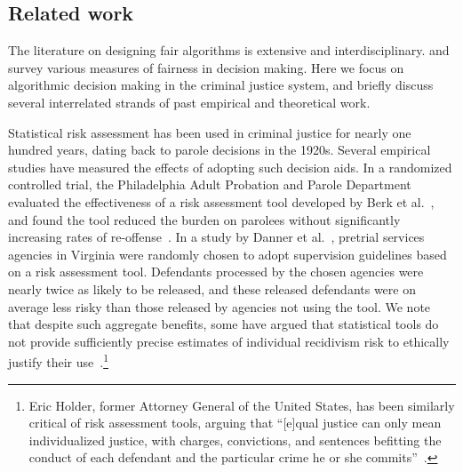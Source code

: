 \documentclass[sigconf]{acmart}
\begin{document}
\subsection{Related work}

The literature on designing fair algorithms is extensive and interdisciplinary.
\citet{romei2014multidisciplinary} and \citet{vzliobaitemeasuring} survey various measures of fairness in decision making. 
Here we focus on algorithmic decision making in the criminal justice system, and briefly discuss several interrelated strands of past empirical and theoretical work.

Statistical risk assessment has been used in criminal justice for nearly one hundred years, 
dating back to parole decisions in the 1920s.
Several empirical studies have measured 
the effects of adopting such decision aids.
In a randomized controlled trial,
the Philadelphia Adult Probation and Parole
Department evaluated the effectiveness of a risk
assessment tool developed by Berk et al.~\cite{berk2009},
and found the tool 
reduced the burden on parolees without significantly
increasing rates of re-offense~\cite{ahlman2009}.
In a study by Danner et al.~\cite{danner2015}, pretrial services agencies in Virginia were randomly chosen to adopt supervision guidelines based on a risk assessment tool. 
Defendants processed by the chosen agencies were nearly twice as likely to be released, and these released defendants were on average less risky than 
those released by agencies not using the tool.
We note that despite
such aggregate benefits, 
some have argued that statistical tools do not provide 
sufficiently precise estimates of individual recidivism risk 
to ethically justify their use~\cite{starr2014evidence}.\footnote{%
Eric Holder, former Attorney General of the United States, has
been similarly critical of risk assessment tools, arguing
that ``[e]qual justice can only mean individualized
justice, with charges, convictions, and sentences
befitting the conduct of each defendant
and the particular crime he or she commits''~\cite{holder2014}.
}
\end{document}
